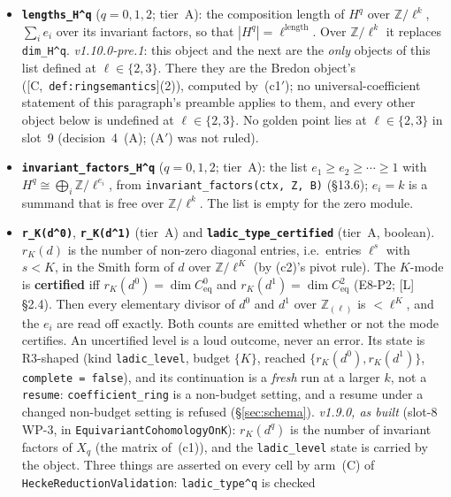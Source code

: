 \documentclass[11pt]{article}
\theoremstyle{remark}
\newcommand{\Z}{\mathbb{Z}}
\newcommand{\HA}[1]{[C,~\texttt{#1}]}      %
\begin{document}
\begin{itemize}
\item \textbf{\texttt{lengths\_H\textasciicircum q}} ($q=0,1,2$; tier~A): the composition length
  of $H^q$ over $\Z/\ell^k$, $\sum_ie_i$ over its invariant factors, so that
  $|H^q|=\ell^{\text{length}}$. Over $\Z/\ell^k$ it replaces \texttt{dim\_H\textasciicircum q}.
  \emph{v1.10.0-pre.1}: this object and the next are the \emph{only} objects of this list defined
  at $\ell\in\{2,3\}$. There they are the Bredon object's (\HA{def:ringsemantics}(2)), computed
  by~(c1$'$); no universal-coefficient statement of this paragraph's preamble applies to them, and
  every other object below is undefined at $\ell\in\{2,3\}$. No golden point lies at
  $\ell\in\{2,3\}$ in slot~9 (decision~4~(A); (A$'$) was not ruled).
\item \textbf{\texttt{invariant\_factors\_H\textasciicircum q}} ($q=0,1,2$; tier~A): the list
  $e_1\ge e_2\ge\cdots\ge1$ with $H^q\cong\bigoplus_i\Z/\ell^{e_i}$, from
  \texttt{invariant\_factors(ctx, Z, B)} (\S13.6); $e_i=k$ is a summand that is free over
  $\Z/\ell^k$. The list is empty for the zero module.
\item \textbf{\texttt{r\_K(d\textasciicircum0)}}, \textbf{\texttt{r\_K(d\textasciicircum1)}}
  (tier~A) and \textbf{\texttt{ladic\_type\_certified}} (tier~A, boolean). $r_K(d)$ is the number
  of non-zero diagonal entries, i.e.\ entries $\ell^s$ with $s<K$, in the Smith form of $d$ over
  $\Z/\ell^K$ (by (c2)'s pivot rule). The $K$-mode is \textbf{certified} iff
  $r_K(d^0)=\dim C^0_{\mathrm{eq}}$ and $r_K(d^1)=\dim C^2_{\mathrm{eq}}$ (E8-P2; [L] \S2.4). Then
  every elementary divisor of $d^0$ and $d^1$ over $\Z_{(\ell)}$ is $<\ell^K$, and the $e_i$ are
  read off exactly. Both counts are emitted whether or not the mode certifies. An uncertified
  level is a loud outcome, never an error. Its state is R3-shaped (kind \texttt{ladic\_level},
  budget $\{K\}$, reached $\{r_K(d^0),r_K(d^1)\}$, \texttt{complete = false}), and its continuation
  is a \emph{fresh} run at a larger $k$, not a \texttt{resume}: \texttt{coefficient\_ring} is a
  non-budget setting, and a resume under a changed non-budget setting is refused
  (\S\ref{sec:schema}). \emph{v1.9.0, as built} (slot-8 WP-3, in \texttt{EquivariantCohomologyOnK}):
  $r_K(d^q)$ is the number of invariant factors of $X_q$ (the matrix of~(c1)), and the
  \texttt{ladic\_level} state is carried by the object. Three things are asserted on every cell
  by arm~(C) of \texttt{HeckeReductionValidation}: \texttt{ladic\_type\textasciicircum q} is checked

\end{itemize}
\end{document}
